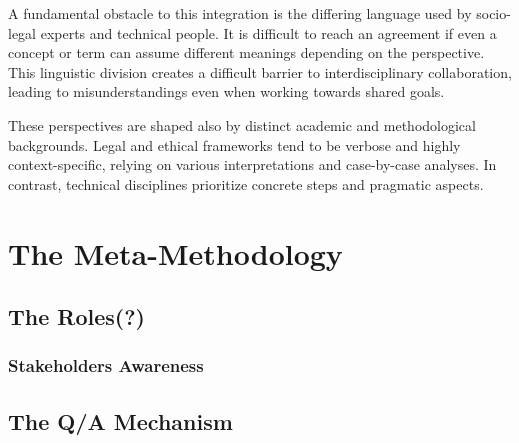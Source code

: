 \documentclass[12pt,a4paper,openright,twoside]{book}
\begin{document}

A fundamental obstacle to this integration is the differing language used by socio-legal experts and technical people. It is difficult to reach an agreement if even a concept or term can assume different meanings depending on the perspective.
This linguistic division creates a difficult barrier to interdisciplinary collaboration, leading to misunderstandings even when working towards shared goals.



These perspectives are shaped also by distinct academic and methodological backgrounds.
%
Legal and ethical frameworks tend to be verbose and highly context-specific, relying on various interpretations and case-by-case analyses. In contrast, technical disciplines prioritize concrete steps and pragmatic aspects.






% 


\chapter{The Meta-Methodology}\label{chap:meta-methodology}



\section{The Roles(?)}

\subsection{Stakeholders Awareness}

\section{The Q/A Mechanism}
\end{document}

